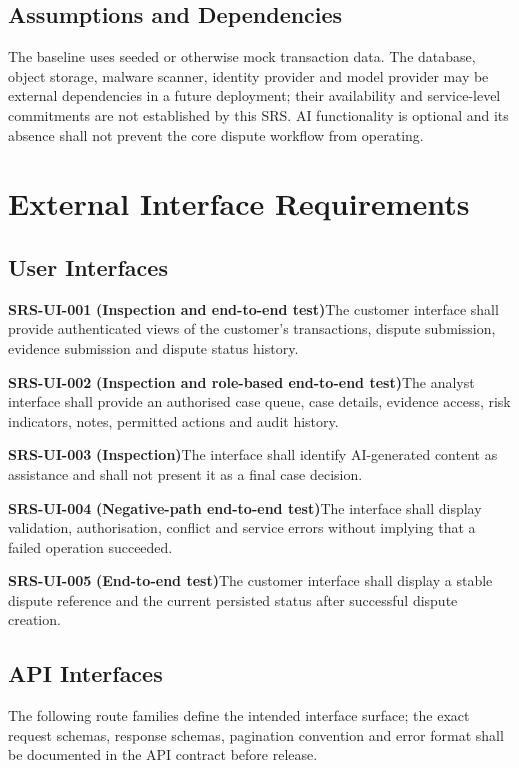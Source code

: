 \documentclass[11pt,a4paper]{article}
\newcommand{\req}[3]{%
    \par\noindent\textbf{\color{ADGBlue}#1}\quad
    \textbf{(#3)}\enspace #2\par\smallskip
}
\begin{document}
\subsection{Assumptions and Dependencies}

The baseline uses seeded or otherwise mock transaction data. The
database, object storage, malware scanner, identity provider and model
provider may be external dependencies in a future deployment; their
availability and service-level commitments are not established by this
SRS. AI functionality is optional and its absence shall not prevent
the core dispute workflow from operating.

\section{External Interface Requirements}

\subsection{User Interfaces}

\req{SRS-UI-001}{The customer interface shall provide authenticated views of the customer's transactions, dispute submission, evidence submission and dispute status history.}{Inspection and end-to-end test}
\req{SRS-UI-002}{The analyst interface shall provide an authorised case queue, case details, evidence access, risk indicators, notes, permitted actions and audit history.}{Inspection and role-based end-to-end test}
\req{SRS-UI-003}{The interface shall identify AI-generated content as assistance and shall not present it as a final case decision.}{Inspection}
\req{SRS-UI-004}{The interface shall display validation, authorisation, conflict and service errors without implying that a failed operation succeeded.}{Negative-path end-to-end test}
\req{SRS-UI-005}{The customer interface shall display a stable dispute reference and the current persisted status after successful dispute creation.}{End-to-end test}

\subsection{API Interfaces}

The following route families define the intended interface surface;
the exact request schemas, response schemas, pagination convention and
error format shall be documented in the API contract before release.
\end{document}
